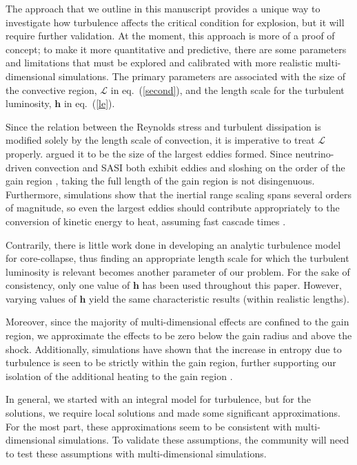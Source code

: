 \documentclass[twocolumn]{aastex6}
\begin{document}

The approach that we outline in this manuscript provides
  a unique way to investigate how turbulence affects the critical
  condition for explosion, but it will require further validation.  At the moment, this approach is more of a
  proof of concept; to make it more quantitative and predictive, there
  are some parameters and limitations that must be explored and
  calibrated with more realistic multi-dimensional simulations.  The
  primary parameters are associated with the size of the convective region, $\mathcal{L}$ in eq.~(\ref{second}), and the length scale for the turbulent
  luminosity, $\textbf{h}$ in eq.~(\ref{le}).

Since the relation between the Reynolds stress and turbulent dissipation is modified solely by the length scale of convection, it is imperative to treat $\mathcal{L}$ properly. \citet{kolm} argued  it to be the size of the largest eddies formed. Since neutrino-driven convection and SASI both exhibit eddies and sloshing on the order of the gain region \citep{couch14,fogl15,fern15,radice16}, taking the full length of the gain region is not disingenuous. Furthermore, simulations show that the inertial range scaling spans several orders of magnitude, so even the largest eddies should contribute appropriately to the conversion of kinetic energy to heat, assuming fast cascade times \citep{armstrong95}. 

Contrarily, there is little work done in developing an analytic turbulence model
for core-collapse, thus finding an appropriate length scale for which
the turbulent luminosity is relevant becomes another parameter of our
problem. For the sake of consistency, only one value of $\textbf{h}$
has been used throughout this paper. However, varying values of $\textbf{h}$ yield the same characteristic results (within realistic lengths). 

Moreover, since the majority of multi-dimensional effects are confined
to the gain region, we approximate the effects to be zero below the gain radius and above the shock. Additionally, simulations
have shown that the increase in entropy due to turbulence is seen to
be strictly within the gain region, further supporting our isolation
of the additional heating to the gain region \citep{murphy13}.

In general, we started with an integral model for
  turbulence, but for the solutions, we require local solutions and
  made some significant approximations.  For the most part, these
  approximations seem to be consistent with multi-dimensional
  simulations.  To validate these assumptions, the community will need
  to test these assumptions with multi-dimensional simulations.
  
\end{document}
